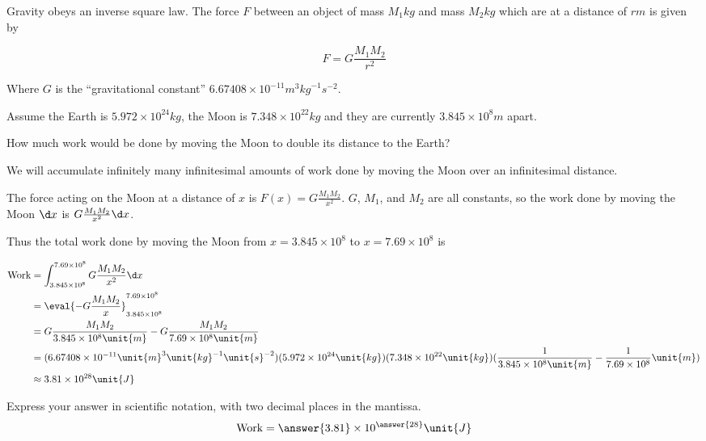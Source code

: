 \documentclass{ximera}
\author{Steven Gubkin}
\begin{document}
\begin{exercise}


Gravity obeys an inverse square law.  The force $F$ between an object
of mass $M_1 \unit{kg}$ and mass $M_2 \unit{kg} $ which are at a
distance of $r \unit{m}$ is given by

\[
F = G\frac{M_1M_2}{r^2}
\]

Where $G$ is the ``gravitational constant'' $6.67408 \times 10^{-11}
\unit{m}^3 \unit{kg}^{-1} \unit{s}^{-2}$.

Assume the Earth is $5.972 \times 10^{24} \unit{kg}$, the Moon is
$7.348 \times 10^{22} \unit{kg}$ and they are currently $3.845 \times
10^8 \unit{m}$ apart.

How much work would be done by moving the Moon to double its distance
to the Earth?

\begin{hint}
We will accumulate infinitely many infinitesimal amounts of work done
by moving the Moon over an infinitesimal distance.
\end{hint}

\begin{hint}
The force acting on the Moon at a distance of $x$ is $F(x) = G
\frac{M_1M_2}{x^2}$.  $G$, $M_1$, and $M_2$ are all constants, so the
work done by moving the Moon $\d x$ is $G \frac{M_1M_2}{x^2} \d x$.
\end{hint}

\begin{hint}
Thus the total work done by moving the Moon from $x = 3.845 \times 10^8$ to $x = 7.69 \times 10^8$ is

\begin{align*}
\textrm{Work} &= \int_{3.845 \times 10^8}^{7.69 \times 10^8} G \frac{M_1M_2}{x^2} \d x\\
		&= \eval{-G\frac{M_1M_2}{x}}_{3.845 \times 10^8}^{7.69 \times 10^8}\\
		&=G\frac{M_1M_2}{3.845 \times 10^8 \unit{m}} - G\frac{M_1M_2}{7.69 \times 10^8 \unit{m}}\\
		&= (6.67408 \times 10^{-11} \unit{m}^3 \unit{kg}^{-1} \unit{s}^{-2})(5.972 \times 10^{24} \unit{kg})(7.348 \times 10^{22} \unit{kg})(\frac{1}{3.845 \times 10^8 \unit{m}} - \frac{1}{7.69 \times 10^8} \unit{m})\\
		&\approx 3.81 \times 10^{28} \unit{J}
\end{align*}
\end{hint}


\begin{prompt}
Express your answer in scientific notation, with two decimal places in the mantissa.
	\[
	\textrm{Work} = \answer{3.81} \times 10^{\answer{28}} \unit{J}
	\]
\end{prompt}
\end{exercise}
\end{document}
